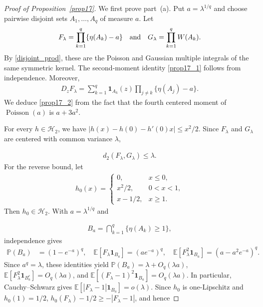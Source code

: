 \documentclass[letterpaper,11pt,reqno]{amsart}
\numberwithin{equation}{section}
\theoremstyle{plain}
\theoremstyle{definition}
\theoremstyle{remark}
\newcommand{\E}{\mathbb{E}}
\newcommand{\PP}{\mathbb{P}}
\newcommand{\ind}{\mathbf{1}}
\newcommand{\cH}{\mathcal{H}}
\DeclareMathOperator{\Pois}{Poisson}
\newcommand{\noi}{\noindent}
\newcommand{\AND}{\quad{\rm and}\quad}
\begin{document}
\begin{proof}[Proof of Proposition~\ref{prop17}]
We first prove part~\textup{(a)}.  Put
$a=\lambda^{1/q}$ and choose pairwise disjoint sets
$A_1,\ldots,A_q$ of measure $a$.  Let
\noi
\begin{align*}
 F_\lambda
 =\prod_{k=1}^q\{\eta(A_k)-a\}
 \AND
 G_\lambda
 =\prod_{k=1}^qW(A_k).
\end{align*}
By \eqref{disjoint_prod}, these are the Poisson and Gaussian multiple
integrals of the same symmetric kernel.
The second-moment identity \eqref{prop17_1} follows from independence.
Moreover,
\noi
\begin{align*}
 D_zF_\lambda
 =\sum_{k=1}^q\ind_{A_k}(z) \prod_{j\neq k}\{\eta(A_j)-a\}.
\end{align*}
We deduce \eqref{prop17_2} from the fact that
the fourth centered moment of $\Pois(a)$ is
$a+3a^2$.


For every $h\in\cH_2$, we have
$|h(x)-h(0)-h'(0)x|\leq x^2/2$.
Since $F_\lambda$ and $G_\lambda$ are centered
with common
variance $\lambda$,

\noi
\begin{align}\label{d2_eq_u}
 d_2(F_\lambda,G_\lambda)\leq\lambda.
\end{align}
For the reverse bound, let
\noi
\begin{align*}
 h_0(x)=
 \begin{cases}
 0,&x\leq0,\\
 x^2/2,&0<x<1,\\
 x-1/2,&x\geq1.
 \end{cases}
\end{align*}
Then $h_0\in\cH_2$.
With $a= \lambda^{1/q}$ and

\noi
\begin{align*}
 B_a=\bigcap_{k=1}^q\{\eta(A_k)\geq1\},
\end{align*}
independence gives
\noi
\begin{align*}
 \PP(B_a)&=(1-e^{-a})^q, \quad
 \E[F_\lambda\ind_{B_a}]=(ae^{-a})^q, \quad
 \E[F_\lambda^2\ind_{B_a}]=(a-a^2e^{-a})^q.
\end{align*}
Since $a^q=\lambda$, these identities yield
$\PP(B_a)=\lambda+O_q(\lambda a)$,
$\E[F_\lambda^2\ind_{B_a^c}]=O_q(\lambda a)$, and
$\E[(F_\lambda-1)^2\ind_{B_a}]=O_q(\lambda a)$.  In particular,
Cauchy--Schwarz gives
$\E[|F_\lambda-1|\ind_{B_a}]=o(\lambda)$.
Since $h_0$ is one-Lipschitz and $h_0(1)=1/2$,
$h_0(F_\lambda)-1/2\geq-|F_\lambda-1|$, and hence


\end{proof}
\end{document}
